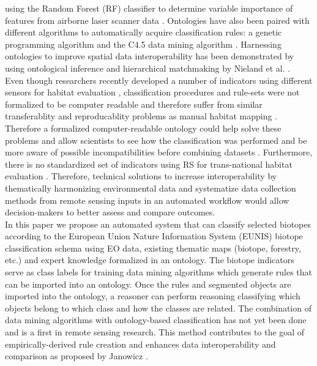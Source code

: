 \documentclass[authoryear, review,12pt,number]{elsarticle}
\begin{document}
using the Random Forest (RF) classifier to determine variable importance of
features from airborne laser scanner data \citep{Belgiu2014}. Ontologies have
also been paired with different algorithms to automatically acquire
classification rules: a genetic programming algorithm
\citep{Forestier2012470} and the C4.5 data mining algorithm
\citep{Sheeren2006ML}. Harnessing ontologies to improve spatial data
interoperability has been demonstrated by using ontological inference and
hierarchical matchmaking by Nieland et al. \citep{Nieland2015}. 
\\
Even though researchers recently developed a number of indicators using
different sensors for habitat evaluation \citep{Nagendra2013}, classification
procedures and rule-sets were not formalized to be computer readable and
therefore suffer from similar transferablity and reproducablity problems as
manual habitat mapping \citep{Arvor2013, Nieland2015}.
Therefore a formalized computer-readable ontology could help solve these
problems and allow scientists to see how the classification was performed and be
more aware of possible incompatibilities before combining datasets
\citep{Janowicz2012}. 
Furthermore, there is no standardized set of indicators
using RS for trans-national habitat evaluation \citep{Lucas2015}. Therefore,
technical solutions to increase interoperability by thematically harmonizing
environmental data and systematize data collection methods from remote sensing
inputs in an automated workflow would allow decision-makers to better assess and
compare outcomes.
\\
In this paper we propose an automated system that can
classify selected biotopes according to the European Union Nature Information
System (EUNIS) biotope classification schema using EO data, existing
thematic maps (biotope, forestry, etc.) and expert knowledge formalized in an
ontology. The biotope indicators serve as class labels for training data mining
algorithms which generate rules that can be imported into an ontology. Once the
rules and segmented objects are imported into the ontology, a reasoner can
perform reasoning classifying which objects belong to which class and how the
classes are related. The combination of data mining algorithms with
ontology-based classification has not yet been done and is a first in remote
sensing research. This method contributes to the goal of empirically-derived
rule creation and enhances data interoperability and comparison as proposed by Janowicz 
\citep{Janowicz2012}.
\end{document}
